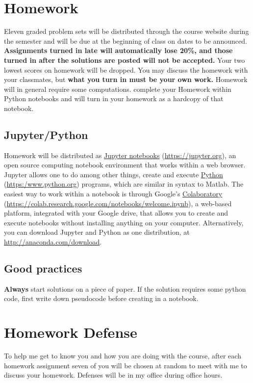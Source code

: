 \documentclass[11pt]{article}
\begin{document}
\section{Homework}
\label{sec:org7c1eee9}
Eleven graded problem sets will be distributed through the course website during the semester and will be due at the beginning of class on dates to be announced.  \textbf{Assignments turned in late will automatically lose 20\%, and those turned in after the solutions are posted will not be accepted.}  Your two lowest scores on homework will be dropped.  You may discuss the homework with your classmates, but \textbf{what you turn in must be your own work.} Homework will in general require some computations. complete your Homework within Python notebooks and will turn in your homework as a hardcopy of that notebook.

\subsection{Jupyter/Python}
\label{sec:org417d3aa}
Homework will be distributed as \href{https://jupyter.org/}{Jupyter notebooks} (\url{https://jupyter.org}), an open source computing notebook environment that works within a web browser. Jupyter allows one to do among other things, create and execute \href{https://www.python.org/}{Python} (\url{https:/www.python.org}) programs, which are similar in syntax to Matlab. The easiest way to work within a notebook is through Google's \href{https://colab.research.google.com/notebooks/welcome.ipynb}{Colaboratory} (\url{https://colab.research.google.com/notebooks/welcome.ipynb}), a web-based platform, integrated with your Google drive, that allows you to create and execute notebooks without installing anything on your computer. Alternatively, you can download Jupyter and Python as one distribution, at \url{http://anaconda.com/download}. 

\subsection{Good practices}
\label{sec:org6135310}
\textbf{Always} start solutions on a piece of paper. If the solution requires some python code, first write down pseudocode before creating in a notebook.

\section{Homework Defense}
\label{sec:org406190f}
To help me get to know you and how you are doing with the course, after each homework assignment seven of you will be chosen at random to meet with me to discuss your homework. Defenses will be in my office during office hours.
\end{document}
